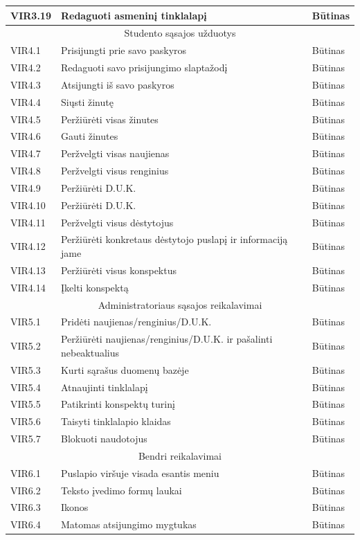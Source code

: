 \documentclass{VUMIFPSkursinis}
\begin{document}
\begin{longtable}{|p{2cm}|p{}|p{2cm}|}
	{VIR3.19}&{Redaguoti asmeninį tinklalapį}&{Būtinas}\\ 	\hline
	\multicolumn{3}{|c|}{Studento sąsajos užduotys}\\	\hline
	{VIR4.1}&{Prisijungti prie savo paskyros}&{Būtinas}\\	\hline
	{VIR4.2}&{Redaguoti savo prisijungimo slaptažodį}&{Būtinas}\\	\hline
	{VIR4.3}&{Atsijungti iš savo paskyros}&{Būtinas}\\	\hline
	{VIR4.4}&{Siųsti žinutę}&{Būtinas}\\	\hline
	{VIR4.5}&{Peržiūrėti visas žinutes}&{Būtinas}\\	\hline
	{VIR4.6}&{Gauti žinutes}&{Būtinas}\\	\hline
	{VIR4.7}&{Peržvelgti visas naujienas}&{Būtinas}\\	\hline
	{VIR4.8}&{Peržvelgti visus renginius}&{Būtinas}\\	\hline
	{VIR4.9}&{Peržiūrėti D.U.K.}&{Būtinas}\\	\hline
	{VIR4.10}&{Peržiūrėti D.U.K.}&{Būtinas}\\	\hline
	{VIR4.11}&{Peržvelgti visus dėstytojus}&{Būtinas}\\	\hline
	{VIR4.12}&{Peržiūrėti konkretaus dėstytojo puslapį ir informaciją jame}&{Būtinas}\\	\hline
	{VIR4.13}&{Peržiūrėti visus konspektus}&{Būtinas}\\	\hline
	{VIR4.14}&{Įkelti konspektą}&{Būtinas}\\	\hline
	\multicolumn{3}{|c|}{Administratoriaus sąsajos reikalavimai}\\	\hline
	{VIR5.1}&{Pridėti naujienas/renginius/D.U.K.}&{Būtinas}\\	\hline
	{VIR5.2}&{Peržiūrėti naujienas/renginius/D.U.K. ir pašalinti nebeaktualius}&{Būtinas}\\	\hline
	{VIR5.3}&{Kurti sąrašus duomenų bazėje}&{Būtinas}\\	\hline
	{VIR5.4}&{Atnaujinti tinklalapį}&{Būtinas}\\	\hline
	{VIR5.5}&{Patikrinti konspektų turinį}&{Būtinas}\\	\hline
	{VIR5.6}&{Taisyti tinklalapio klaidas}&{Būtinas}\\	\hline
	{VIR5.7}&{Blokuoti naudotojus}&{Būtinas}\\	\hline
	\multicolumn{3}{|c|}{Bendri reikalavimai}\\	\hline
	{VIR6.1}&{Puslapio viršuje visada esantis meniu}&{Būtinas}\\	\hline
	{VIR6.2}&{Teksto įvedimo formų laukai}&{Būtinas}\\	\hline
	{VIR6.3}&{Ikonos}&{Būtinas}\\	\hline
	{VIR6.4}&{Matomas atsijungimo mygtukas}&{Būtinas}\\	\hline
\end{longtable}
\end{document}
